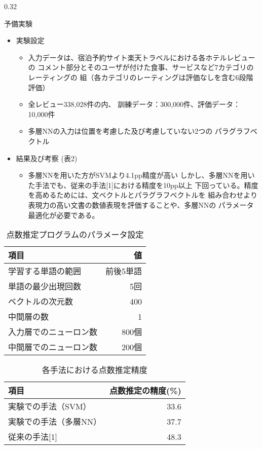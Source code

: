 \documentclass[10pt,unicode]{beamer}
\newcommand{\columnsize}{0.32}
\begin{document}
\begin{frame}{}
\begin{columns}[t]
\begin{column}{\columnsize\textwidth}
\begin{block}{予備実験}
\begin{itemize}
      \item 実験設定
      \begin{itemize}
        \item 入力データは、宿泊予約サイト楽天トラベルにおける各ホテルレビューの
        コメント部分とそのユーザが付けた食事、サービスなど7カテゴリのレーティングの
        組（各カテゴリのレーティングは評価なしを含む6段階評価）
        \item 全レビュー338,028件の内、
        訓練データ：300,000件、評価データ：10,000件
        \item 多層NNの入力は位置を考慮した及び考慮していない2つの
        パラグラフベクトル
      \end{itemize}

      \item 結果及び考察 (表2)
      \begin{itemize}
        \item 多層NNを用いた方がSVMより4.1pp精度が高い
        しかし、多層NNを用いた手法でも、従来の手法[1]における精度を10pp以上
        下回っている。精度を高めるためには、文ベクトルとパラグラフベクトルを
        組み合わせより表現力の高い文書の数値表現を評価することや、多層NNの
        パラメータ最適化が必要である。
      \end{itemize}
    \end{itemize}

    \begin{table}
    \caption{点数推定プログラムのパラメータ設定}
    \label{table:parameters}
    \begin{tabular}{l | r}
    項目 & 値 \\
    \hline
    学習する単語の範囲 & 前後5単語 \\
    単語の最少出現回数 & 5回 \\
    ベクトルの次元数 & 400 \\
    中間層の数 & 1 \\
    入力層でのニューロン数 & 800個 \\
    中間層でのニューロン数 & 200個
    \end{tabular}
    \end{table}

    \begin{table}
    \caption{各手法における点数推定精度}
    \begin{tabular}{l | r}
    項目 & 点数推定の精度(\%) \\
    \hline
    実験での手法（SVM）& 33.6 \\
    実験での手法（多層NN）& 37.7 \\
    従来の手法[1] & 48.3
    \end{tabular}
    \end{table}
  \end{block} %


\end{column}
\end{columns}
\end{frame}
\end{document}
